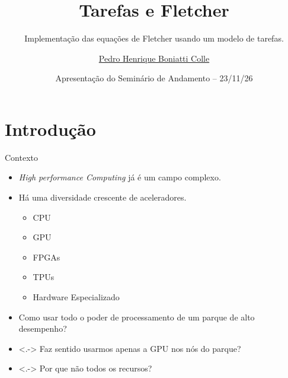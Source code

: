 \documentclass{beamer}
\title{Tarefas e Fletcher}
\subtitle{Implementação das equações de Fletcher usando um modelo de tarefas.}
\author{\href{mailto:phbcolle@inf.ufrgs.br}{Pedro Henrique Boniatti Colle}}
\date{Apresentação do Seminário de Andamento -- 23/11/26}
\begin{document}
\maketitle



\section{Introdução}

\begin{frame}{Contexto}
  \begin{itemize}
  \item<+-> \textit{High performance Computing} já é um campo complexo.
  \item<+-> Há uma diversidade crescente de aceleradores.
    \begin{itemize}
    \item CPU
    \item GPU
    \item FPGAs
    \item TPUs
    \item Hardware Especializado
    \end{itemize}
  \item<+-> Como usar todo o poder de processamento de um parque de alto desempenho?
  \item<.-> Faz sentido usarmos apenas a GPU nos nós do parque?
  \item<.-> Por que não todos os recursos?
  \end{itemize}
\end{frame}
\end{document}
